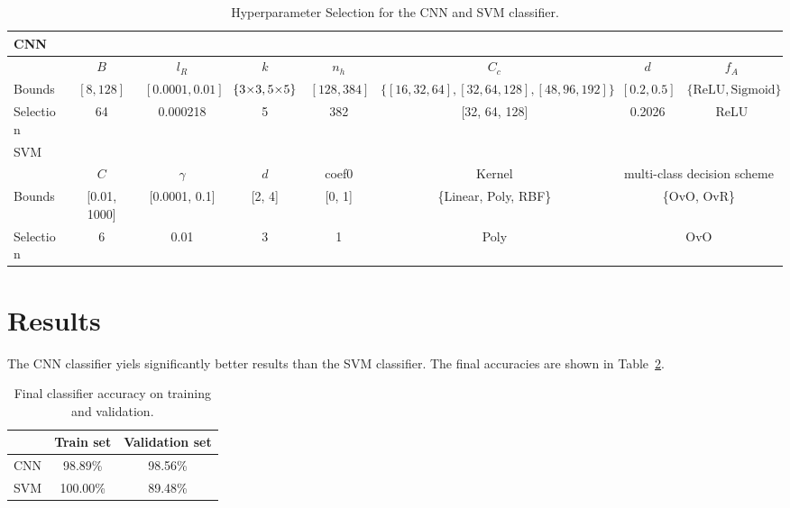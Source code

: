 \documentclass[a4, 10 pt, conference]{ieeeconf}  %
\begin{document}
\renewcommand{\arraystretch}{1.2}
\begin{table}[htbp]
  \centering
  \begin{tabular}{|l|c|c|c|c|c|c|c|}
    \hline
    \multicolumn{8}{|l|}{CNN} \\
    \hline
    & $B$ & $l_R$ & $k$ & $n_h$ & $C_c$ & $d$ & $f_A$ \\
    \hline
    Bounds & $[8,128]$ & $[0.0001, 0.01]$ & $\{\text{3\texttimes3}, \text{5\texttimes5}\}$ & $[128,384]$ & $\{[16,32,64],[32,64,128],[48,96,192]\}$ & $[0.2,0.5]$ & $\{\text{ReLU}, \text{Sigmoid}\}$ \\
    Selection & 64 & 0.000218 & 5\texttimes5 & 382 & [32, 64, 128] & 0.2026 & ReLU\\
    \hline
    \multicolumn{8}{|l|}{SVM} \\
    \hline
    & $C$ & $\gamma$ & $d$ & coef0 & Kernel & \multicolumn{2}{c|}{multi-class decision scheme} \\
    \hline
    Bounds & [0.01, 1000] & [0.0001, 0.1] & [2, 4] & [0, 1] & \{Linear, Poly, RBF\} & \multicolumn{2}{c|}{\{OvO, OvR\}} \\
    Selection & 6 & 0.01 & 3 & 1 & Poly & \multicolumn{2}{c|}{OvO} \\
    \hline
  \end{tabular}
  \caption{Hyperparameter Selection for the CNN and SVM classifier.}
  \label{fig:hyperparameter_selection}
\end{table}

\section{Results}
\label{sec:results}

The CNN classifier yiels significantly better results than the SVM classifier.
The final accuracies are shown in Table~\ref{tab:classifier_accuracy}.


\begin{table}[h]
  \centering
  \begin{tabular}{|l|c|c|}
    \hline
    & Train set & Validation set\\
    \hline
    CNN & 98.89\% & 98.56\% \\
    SVM & 100.00\% & 89.48\% \\
    \hline
  \end{tabular}
  \caption{Final classifier accuracy on training and validation.}
  \label{tab:classifier_accuracy}
\end{table}
\end{document}
